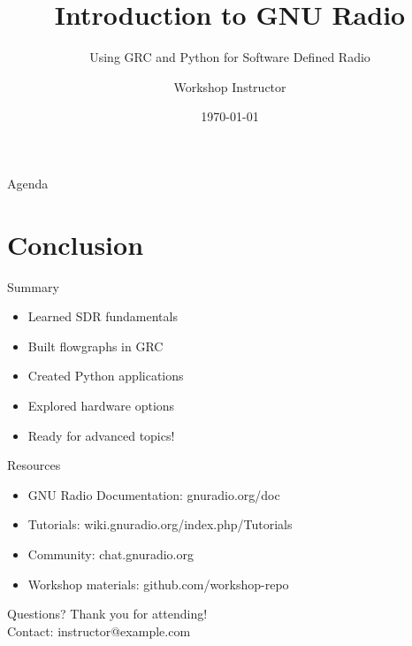 \documentclass[aspectratio=169,11pt]{beamer}
\title{Introduction to GNU Radio}
\subtitle{Using GRC and Python for Software Defined Radio}
\author{Workshop Instructor}
\institute{GRCon 2025}
\date{\today}
\begin{document}
\begin{frame}
\titlepage
\end{frame}

\begin{frame}{Agenda}
\tableofcontents
\end{frame}








\section{Conclusion}
\begin{frame}{Summary}
\begin{itemize}
    \item Learned SDR fundamentals
    \item Built flowgraphs in GRC
    \item Created Python applications
    \item Explored hardware options
    \item Ready for advanced topics!
\end{itemize}
\end{frame}

\begin{frame}{Resources}
\begin{itemize}
    \item GNU Radio Documentation: gnuradio.org/doc
    \item Tutorials: wiki.gnuradio.org/index.php/Tutorials
    \item Community: chat.gnuradio.org
    \item Workshop materials: github.com/workshop-repo
\end{itemize}
\end{frame}

\begin{frame}{Questions?}
\centering
\Large Thank you for attending!\\[1em]
\normalsize
Contact: instructor@example.com
\end{frame}
\end{document}
